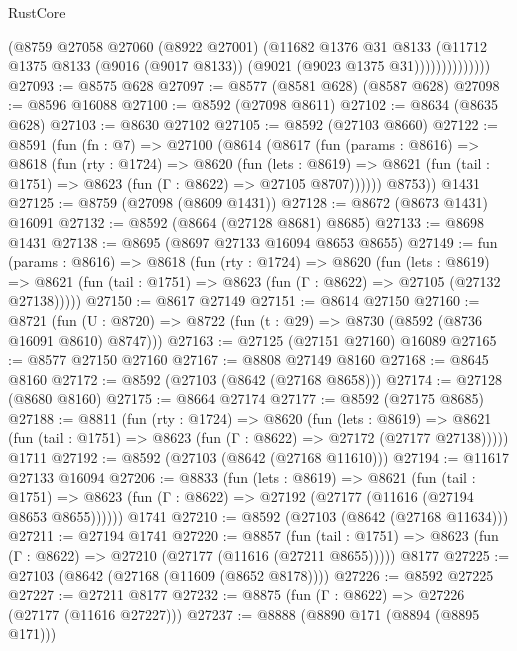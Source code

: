 \begin{lexlean}{RustCore}
\begin{coremodule}
                      (@8759
                        @27058
                        @27060
                        (@8922 @27001)
                        (@11682
                          @1376
                          @31
                          @8133
                          (@11712
                            @1375
                            @8133
                            (@9016 (@9017 @8133))
                            (@9021 (@9023 @1375 @31))))))))))))))
@27093 := @8575 @628
@27097 := @8577 (@8581 @628) (@8587 @628)
@27098 := @8596 @16088
@27100 := @8592 (@27098 @8611)
@27102 := @8634 (@8635 @628)
@27103 := @8630 @27102
@27105 := @8592 (@27103 @8660)
@27122 := @8591
    (fun (fn : @7) =>
    @27100
      (@8614
        (@8617
          (fun (params : @8616) =>
          @8618
            (fun (rty : @1724) =>
            @8620
              (fun (lets : @8619) =>
              @8621 (fun (tail : @1751) => @8623 (fun (Γ : @8622) => @27105 @8707))))))
        @8753))
    @1431
@27125 := @8759 (@27098 (@8609 @1431))
@27128 := @8672 (@8673 @1431) @16091
@27132 := @8592 (@8664 (@27128 @8681) @8685)
@27133 := @8698 @1431
@27138 := @8695 (@8697 @27133 @16094 @8653 @8655)
@27149 := fun (params : @8616) =>
  @8618
    (fun (rty : @1724) =>
    @8620
      (fun (lets : @8619) =>
      @8621 (fun (tail : @1751) => @8623 (fun (Γ : @8622) => @27105 (@27132 @27138)))))
@27150 := @8617 @27149
@27151 := @8614 @27150
@27160 := @8721
    (fun (U : @8720) => @8722 (fun (t : @29) => @8730 (@8592 (@8736 @16091 @8610) @8747)))
@27163 := @27125 (@27151 @27160) @16089
@27165 := @8577 @27150 @27160
@27167 := @8808 @27149 @8160
@27168 := @8645 @8160
@27172 := @8592 (@27103 (@8642 (@27168 @8658)))
@27174 := @27128 (@8680 @8160)
@27175 := @8664 @27174
@27177 := @8592 (@27175 @8685)
@27188 := @8811
    (fun (rty : @1724) =>
    @8620
      (fun (lets : @8619) =>
      @8621 (fun (tail : @1751) => @8623 (fun (Γ : @8622) => @27172 (@27177 @27138)))))
    @1711
@27192 := @8592 (@27103 (@8642 (@27168 @11610)))
@27194 := @11617 @27133 @16094
@27206 := @8833
    (fun (lets : @8619) =>
    @8621
      (fun (tail : @1751) =>
      @8623 (fun (Γ : @8622) => @27192 (@27177 (@11616 (@27194 @8653 @8655))))))
    @1741
@27210 := @8592 (@27103 (@8642 (@27168 @11634)))
@27211 := @27194 @1741
@27220 := @8857
    (fun (tail : @1751) => @8623 (fun (Γ : @8622) => @27210 (@27177 (@11616 (@27211 @8655)))))
    @8177
@27225 := @27103 (@8642 (@27168 (@11609 (@8652 @8178))))
@27226 := @8592 @27225
@27227 := @27211 @8177
@27232 := @8875 (fun (Γ : @8622) => @27226 (@27177 (@11616 @27227)))
@27237 := @8888 (@8890 @171 (@8894 (@8895 @171)))

\end{coremodule}
\end{lexlean}
